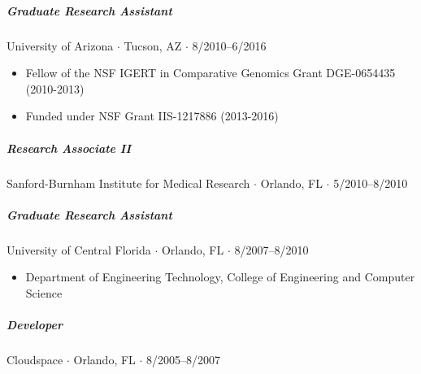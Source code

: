 \documentclass[10pt,letterpaper]{article}
\newcommand{\bigdot}{$\cdot$\xspace}
\begin{document}
\subparagraph{Graduate Research Assistant}
University of Arizona \bigdot Tucson, AZ \bigdot 8/2010--6/2016 
\begin{itemize}
    \item Fellow of the NSF IGERT in Comparative Genomics Grant DGE-0654435 (2010-2013)
    \item Funded under NSF Grant IIS-1217886 (2013-2016)
\end{itemize}

\subparagraph{Research Associate II}
Sanford-Burnham Institute for Medical Research \bigdot Orlando, FL \bigdot 5/2010--8/2010 

\subparagraph{Graduate Research Assistant}
University of Central Florida \bigdot Orlando, FL \bigdot 8/2007--8/2010 
\begin{itemize}
    \item Department of Engineering Technology, College of Engineering and Computer Science
\end{itemize}

\subparagraph{Developer}
Cloudspace \bigdot Orlando, FL \bigdot 8/2005--8/2007 
\end{document}
